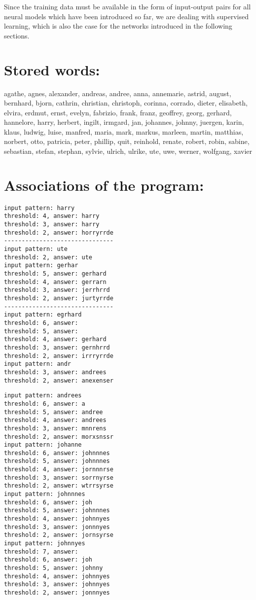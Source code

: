 \documentclass[10pt]{article}
\begin{document}
Since the training data must be available in the form of input-output pairs for all neural models which have been introduced so far, we are dealing with supervised learning, which is also the case for the networks introduced in the following sections.

\section*{Stored words:}
agathe, agnes, alexander, andreas, andree, anna, annemarie, astrid, august, bernhard, bjorn, cathrin, christian, christoph, corinna, corrado, dieter, elisabeth, elvira, erdmut, ernst, evelyn, fabrizio, frank, franz, geoffrey, georg, gerhard, hannelore, harry, herbert, ingilt, irmgard, jan, johannes, johnny, juergen, karin, klaus, ludwig, luise, manfred, maria, mark, markus, marleen, martin, matthias, norbert, otto, patricia, peter, phillip, quit, reinhold, renate, robert, robin, sabine, sebastian, stefan, stephan, sylvie, ulrich, ulrike, ute, uwe, werner, wolfgang, xavier

\section*{Associations of the program:}
\begin{verbatim}
input pattern: harry
threshold: 4, answer: harry
threshold: 3, answer: harry
threshold: 2, answer: horryrrde
-------------------------------
input pattern: ute
threshold: 2, answer: ute
input pattern: gerhar
threshold: 5, answer: gerhard
threshold: 4, answer: gerrarn
threshold: 3, answer: jerrhrrd
threshold: 2, answer: jurtyrrde
-------------------------------
input pattern: egrhard
threshold: 6, answer:
threshold: 5, answer:
threshold: 4, answer: gerhard
threshold: 3, answer: gernhrrd
threshold: 2, answer: irrryrrde
input pattern: andr
threshold: 3, answer: andrees
threshold: 2, answer: anexenser
\end{verbatim}

\begin{verbatim}
input pattern: andrees
threshold: 6, answer: a
threshold: 5, answer: andree
threshold: 4, answer: andrees
threshold: 3, answer: mnnrens
threshold: 2, answer: morxsnssr
input pattern: johanne
threshold: 6, answer: johnnnes
threshold: 5, answer: johnnnes
threshold: 4, answer: jornnnrse
threshold: 3, answer: sorrnyrse
threshold: 2, answer: wtrrsyrse
input pattern: johnnnes
threshold: 6, answer: joh
threshold: 5, answer: johnnnes
threshold: 4, answer: johnnyes
threshold: 3, answer: jonnnyes
threshold: 2, answer: jornsyrse
input pattern: johnnyes
threshold: 7, answer:
threshold: 6, answer: joh
threshold: 5, answer: johnny
threshold: 4, answer: johnnyes
threshold: 3, answer: johnnyes
threshold: 2, answer: jonnnyes
\end{verbatim}
\end{document}

